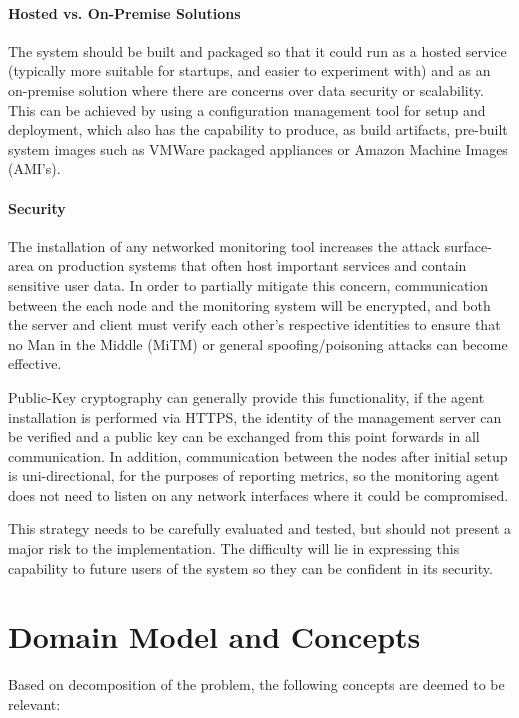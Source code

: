 \documentclass{cshonours}
\begin{document}
\paragraph{Hosted vs. On-Premise Solutions} The system should be built and packaged so that it could run as a hosted service (typically more suitable for startups, and easier to experiment with) and as an on-premise solution where there are concerns over data security or scalability. This can be achieved by using a configuration management tool for setup and deployment, which also has the capability to produce, as build artifacts, pre-built system images such as VMWare packaged appliances or Amazon Machine Images (AMI's).

\paragraph{Security} The installation of any networked monitoring tool increases the attack surface-area on production systems that often host important services and contain sensitive user data. In order to partially mitigate this concern, communication between the each node and the monitoring system will be encrypted, and both the server and client must verify each other’s respective identities to ensure that no Man in the Middle (MiTM) or general spoofing/poisoning attacks can become effective.

Public-Key cryptography can generally provide this functionality, if the agent installation is performed via HTTPS, the identity of the management server can be verified and a public key can be exchanged from this point forwards in all communication. In addition, communication between the nodes after initial setup is uni-directional, for the purposes of reporting metrics, so the monitoring agent does not need to listen on any network interfaces where it could be compromised.

This strategy needs to be carefully evaluated and tested, but should not present a major risk to the implementation. The difficulty will lie in expressing this capability to future users of the system so they can be confident in its security.

\pagebreak
\section{Domain Model and Concepts}

Based on decomposition of the problem, the following concepts are deemed to be relevant:
\end{document}

